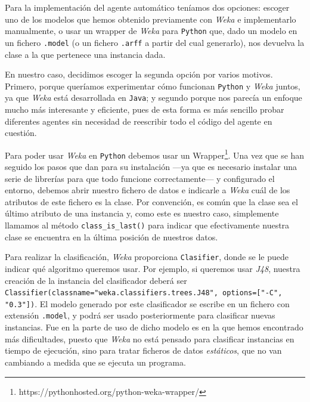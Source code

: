 \documentclass[12pt]{article}
\begin{document}
Para la implementación del agente automático teníamos dos opciones: escoger uno de los modelos que hemos obtenido previamente con \emph{Weka} e implementarlo manualmente, o usar un wrapper de \emph{Weka} para \texttt{Python} que, dado un modelo en un fichero \texttt{.model} (o un fichero \texttt{.arff} a partir del cual generarlo), nos devuelva la clase a la que pertenece una instancia dada.

En nuestro caso, decidimos escoger la segunda opción por varios motivos. Primero, porque queríamos experimentar cómo funcionan \texttt{Python} y \emph{Weka} juntos, ya que \emph{Weka} está desarrollada en \texttt{Java}; y segundo porque nos parecía un enfoque mucho más interesante y eficiente, pues de esta forma es más sencillo probar diferentes agentes sin necesidad de reescribir todo el código del agente en cuestión.

Para poder usar \emph{Weka} en \texttt{Python} debemos usar un Wrapper\footnote{https://pythonhosted.org/python-weka-wrapper/}. Una vez que se han seguido los pasos que dan para su instalación ---ya que es necesario instalar una serie de librerías para que todo funcione correctamente--- y configurado el entorno, debemos abrir nuestro fichero de datos e indicarle a \emph{Weka} cuál de los atributos de este fichero es la clase. Por convención, es común que la clase sea el último atributo de una instancia y, como este es nuestro caso, simplemente llamamos al método \texttt{class\_is\_last()} para indicar que efectivamente nuestra clase se encuentra en la última posición de nuestros datos.

\newpage

Para realizar la clasificación, \emph{Weka} proporciona \texttt{Clasifier}, donde se le puede indicar qué algoritmo queremos usar. Por ejemplo, si queremos usar \emph{J48}, nuestra creación de la instancia del clasificador deberá ser \texttt{Classifier(classname="weka.classifiers.trees.J48", options=["-C", "0.3"])}. El modelo generado por este clasificador se escribe en un fichero con extensión \texttt{.model}, y podrá ser usado posteriormente para clasificar nuevas instancias. Fue en la parte de uso de dicho modelo es en la que hemos encontrado más dificultades, puesto que \emph{Weka} no está pensado para clasificar instancias en tiempo de ejecución, sino para tratar ficheros de datos \emph{estáticos}, que no van cambiando a medida que se ejecuta un programa.

\vspace{0.5cm}
\end{document}
